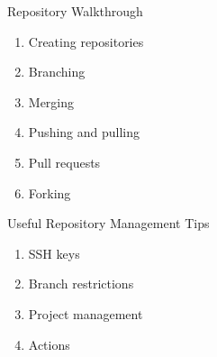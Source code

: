 \documentclass[aspectratio=169]{beamer}
\begin{document}
\begin{frame}{Repository Walkthrough}

\begin{enumerate}
\item
  Creating repositories
\item
  Branching
\item
  Merging
\item
  Pushing and pulling
\item
  Pull requests
\item
  Forking
\end{enumerate}

\end{frame}

\begin{frame}{Useful Repository Management Tips}

\begin{enumerate}
\item
  SSH keys
\item
  Branch restrictions
\item
  Project management
\item
  Actions
\end{enumerate}

\end{frame}
\end{document}
